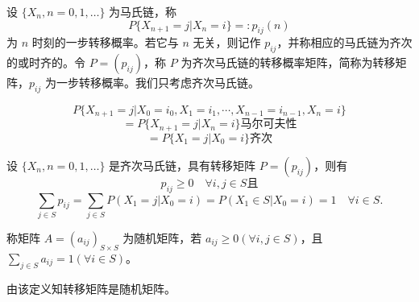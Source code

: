 \documentclass[lang=cn,10pt,thmcnt=section]{elegantbook}
\begin{document}
\begin{definition}[转移概率]
	设 $\{X_n, n = 0, 1, \ldots\}$ 为马氏链，称
\[ P\{X_{n+1} = j | X_n = i\} =: p_{ij}(n) \]
为 $n$ 时刻的一步转移概率。若它与 $n$ 无关，则记作 $p_{ij}$，并称相应的马氏链为齐次的或时齐的。令 $P = (p_{ij})$，称 $P$ 为齐次马氏链的转移概率矩阵，简称为转移矩阵，$p_{ij}$ 为一步转移概率。我们只考虑齐次马氏链。

\end{definition}

\[ P\{X_{n+1} = j | X_0 = i_0, X_1 = i_1, \cdots, X_{n-1} = i_{n-1}, X_n = i\} \]
\[ = P\{X_{n+1} = j | X_n = i\} \text{马尔可夫性} \]
\[ = P\{X_1 = j | X_0 = i\} \text{齐次} \]

设 $\{X_n, n = 0, 1, \ldots\}$ 是齐次马氏链，具有转移矩阵 $P = (p_{ij})$，则有
\[ p_{ij} \geq 0 \quad \forall i, j \in S \text{且} \]
\[ \sum_{j \in S} p_{ij} = \sum_{j \in S} P(X_1 = j | X_0 = i) = P(X_1 \in S | X_0 = i) = 1 \quad \forall i \in S. \]

\begin{definition}[随机矩阵]
	称矩阵 $A = (a_{ij})_{S \times S}$ 为随机矩阵，若 $a_{ij} \geq 0 (\forall i, j \in S)$，且 $\sum_{j \in S} a_{ij} = 1 (\forall i \in S)$。
\end{definition}

由该定义知转移矩阵是随机矩阵。
\end{document}
